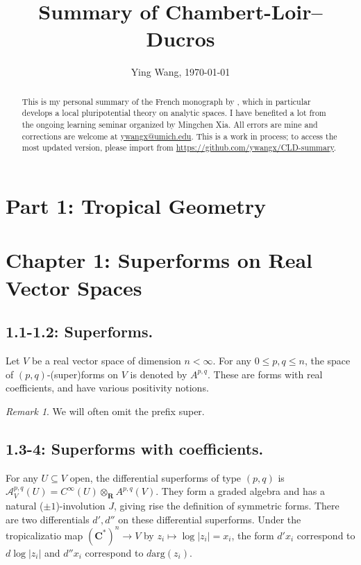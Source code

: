 \documentclass[12pt,reqno]{amsart}
\theoremstyle{definition}
\theoremstyle{remark}
\newtheorem{remark}[theorem]{Remark}
\theoremstyle{citedrem}
\theoremstyle{cited}
\theoremstyle{citeddef}
\theoremstyle{step}
\begin{document}
\title{Summary of Chambert-Loir--Ducros}


\author[Ying Wang]{Ying Wang, \today}
\begin{abstract}This is my personal summary of the French monograph by \cite{CLD25}, which in particular develops a local pluripotential theory on analytic spaces. I have benefited a lot from the ongoing learning seminar organized by Mingchen Xia. All errors are mine and corrections are welcome at \url{ywangx@umich.edu}. This is a work in process; to access the most updated version, please import from \url{https://github.com/ywangx/CLD-summary}.
\end{abstract}





\maketitle
\section*{Part 1: Tropical Geometry}

\section*{Chapter 1: Superforms on Real Vector Spaces}

\subsection*{1.1-1.2: Superforms.}
Let $V$ be a real vector space of dimension $n < \infty$. For any $0 \leq p, q \leq n$, the space of $(p,q)$-(super)forms on $V$ is denoted by $A^{p,q}$. These are forms with real coefficients, and have various positivity notions.

\begin{remark}
    We will often omit the prefix super. 
\end{remark}

\subsection*{1.3-4: Superforms with coefficients.}
For any $U \subseteq V$ open, the differential superforms of type $(p,q)$ is $\mathscr{A}^{p,q}_V(U) = C^\infty(U) \otimes_{\mathbf{R}} A^{p,q}(V).$ They form a graded algebra and has a natural ($\pm 1$)-involution $J$, giving rise the definition of symmetric forms. There are two differentials $d', d''$ on these differential superforms. Under the tropicalizatio map $(\mathbf{C}^\ast)^n \to V$ by $z_i \mapsto \log|z_i| = x_i$, the form $d'x_i$ correspond to $d\log|z_i|$ and $d''x_i$ correspond to $d\mathrm{arg}(z_i)$. 
\end{document}
